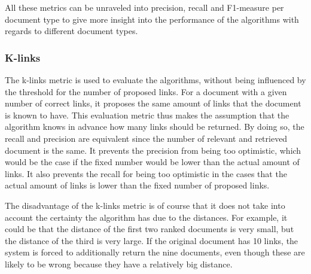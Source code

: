 All these metrics can be unraveled into precision, recall and F1-measure per
document type to give more insight into the performance of the algorithms with
regards to different document types. 

\subsubsection{K-links}
The k-links metric is used to evaluate the algorithms, without being influenced by the threshold for the number of proposed links. For a document with a given number of correct links, it proposes the same amount of links that the document is known to have. This evaluation metric thus makes the assumption that the algorithm knows in advance how many links should be returned. By doing so, the recall and precision are equivalent since the number of relevant and retrieved document is the same. It prevents the precision from being too optimistic, which would be the case if the fixed number would be lower than the actual amount of links. It also prevents the recall for being too optimistic in the cases that the actual amount of links is lower than the fixed number of proposed links. 

The disadvantage of the k-links metric is of course that it does not take into account the certainty the algorithm has due to the distances. For example, it could be that the distance of the first two ranked documents is very small, but the distance of the third is very large. If the original document has 10 links, the system is forced to additionally return the nine documents, even though these are likely to be wrong because they have a relatively big distance. 

